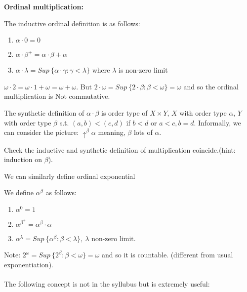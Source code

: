 {\bf Ordinal multiplication:}\\
\begin{definition} The inductive ordinal definition is as follows:
\begin{enumerate}
\item $\alpha \cdot 0 = 0$\\
\item $\alpha \cdot \beta^+ =\alpha \cdot \beta + \alpha$\\
\item $\alpha \cdot \lambda = Sup~\{\alpha \cdot \gamma: \gamma < \lambda\}$ where $\lambda$ is non-zero limit
\end{enumerate}
\end{definition}
\begin{example} $\omega \cdot 2 = \omega \cdot 1 + \omega = \omega + \omega$.
But $2 \cdot \omega = Sup~\{2 \cdot \beta: \beta < \omega\} = \omega$
and so the ordinal multiplication is Not commutative.
\end{example}
\begin{definition} The synthetic definition of $\alpha \cdot \beta$
is order type of $X \times Y$, $X$ with order type $\alpha$, $Y$
with order type $\beta$ s.t. $(a,b) < (c,d)$ if $b<d$ or $a<c, b=d$.
Informally, we can consider the picture: $\uparrow^\beta \alpha$ meaning, $\beta$ lots of $\alpha$.
\end{definition}
\begin{exercise} Check the inductive and synthetic definition of
multiplication coincide.(hint: induction on $\beta$).
\end{exercise}
We can similarly define ordinal exponential
\begin{definition} We define $\alpha^\beta$ as follows:
\begin{enumerate}
\item $\alpha^{0} = 1$\\
\item $\alpha^{\beta^+} = \alpha^\beta \cdot \alpha$\\
\item $\alpha^\lambda = Sup~\{\alpha^\beta: \beta < \lambda\},~\lambda$ non-zero limit.
\end{enumerate}
\end{definition}
Note: $2^\omega = Sup~\{2^\beta: \beta < \omega\} = \omega$ and so it is countable.
(different from usual exponentiation).\\
~\\
The following concept is not in the syllubus but is extremely useful:
